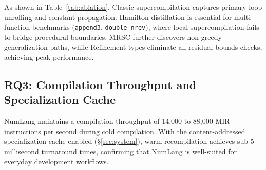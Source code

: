 

As shown in Table~\ref{tab:ablation}, Classic supercompilation captures primary loop unrolling and constant propagation. Hamilton distillation is essential for multi-function benchmarks (\texttt{append3}, \texttt{double\_nrev}), where local supercompilation fails to bridge procedural boundaries. MRSC further discovers non-greedy generalization paths, while Refinement types eliminate all residual bounds checks, achieving peak performance.

\subsection{RQ3: Compilation Throughput and Specialization Cache}
NumLang maintains a compilation throughput of 14,000 to 88,000 MIR instructions per second during cold compilation. With the content-addressed specialization cache enabled (\S\ref{sec:system}), warm recompilation achieves sub-5 millisecond turnaround times, confirming that NumLang is well-suited for everyday development workflows.
